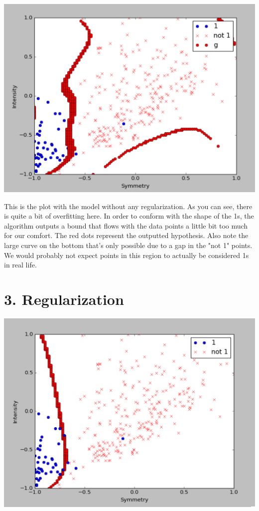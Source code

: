 \documentclass[12pt]{article}
\begin{document}
\includegraphics[scale=.5]{2-1.png}

This is the plot with the model without any regularization. As you can see, there is quite a bit of overfitting here. In order to conform with the shape of the 1s, the algorithm outputs a bound that flows with the data points a little bit too much for our comfort. The red dots represent the outputted hypothesis. Also note the large curve on the bottom that's only possible due to a gap in the "not 1" points. We would probably not expect points in this region to actually be considered 1s in real life.

\section*{3. Regularization}
\includegraphics[scale=.5]{3-1.png}
\end{document}
